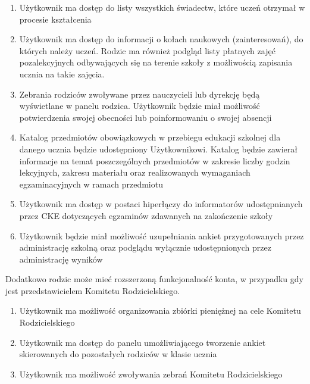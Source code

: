 \documentclass{article}
\begin{document}
\begin{enumerate}
	\item Użytkownik ma dostęp do listy wszystkich świadectw, które uczeń otrzymał w procesie kształcenia
	\item Użytkownik ma dostęp do informacji o kołach naukowych (zainteresowań), do których należy uczeń. Rodzic ma również podgląd listy płatnych zajęć pozalekcyjnych odbywających się na terenie szkoły z możliwością zapisania ucznia na takie zajęcia.
	\item Zebrania rodziców zwoływane przez nauczycieli lub dyrekcję będą wyświetlane w panelu rodzica. Użytkownik będzie miał możliwość potwierdzenia swojej obecności lub poinformowaniu o swojej absencji
	\item Katalog przedmiotów obowiązkowych w przebiegu edukacji szkolnej dla danego ucznia będzie udostępniony Użytkownikowi. Katalog będzie zawierał informacje na temat poszczególnych przedmiotów w zakresie liczby godzin lekcyjnych, zakresu materiału oraz realizowanych wymaganiach egzaminacyjnych w ramach przedmiotu
	\item Użytkownik ma dostęp w postaci hiperłączy do informatorów udostępnianych przez CKE dotyczących egzaminów zdawanych na zakończenie szkoły
	\item Użytkownik będzie miał możliwość uzupełniania ankiet przygotowanych przez administrację szkolną oraz podglądu wyłącznie udostępnionych przez administrację wyników
\end{enumerate}
	Dodatkowo rodzic może mieć rozszerzoną funkcjonalność konta, w przypadku gdy jest przedstawicielem Komitetu Rodzicielskiego.
	\begin{enumerate}
		\item Użytkownik ma możliwość organizowania zbiórki pieniężnej na cele Komitetu Rodzicielskiego
		\item Użytkownik ma dostęp do panelu umożliwiającego tworzenie ankiet skierowanych do pozostałych rodziców w klasie ucznia
		\item Użytkownik ma możliwość zwoływania zebrań Komitetu Rodzicielskiego
	\end{enumerate}
\end{document}
